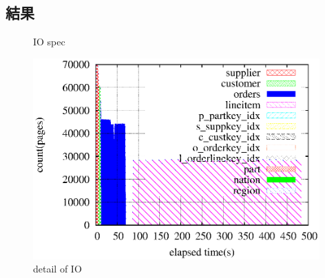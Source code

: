 \documentclass[11pt,a4paper]{jsarticle}
\newlength{\subfigwidth}
\newlength{\subfigcolsep}
\begin{document}
\subsection{結果}
\begin{figure}[thbp]
 \setlength{\subfigwidth}{.5\linewidth}
 \addtolength{\subfigwidth}{-.5\subfigcolsep}
 \begin{minipage}[b]{\subfigwidth}
 \end{minipage}
  \begin{minipage}[b]{\subfigwidth}
  \end{minipage}
  \caption{IO spec}
  \label{fig:8core}
\end{figure}

\begin{figure}[thbp]
 \begin{center}
  \includegraphics[width=110mm]{trace_54233refhist.eps}
 \end{center}
 \caption{detail of IO}
 \label{fig:8ioref}
\end{figure}
\end{document}
